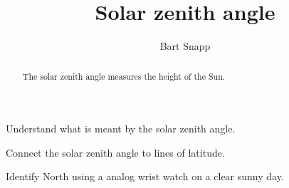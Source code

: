 \documentclass[noauthor,nooutcomes,handout,hints]{ximera}
\title{Solar zenith angle}
\author{Bart Snapp}
\begin{document}
\begin{abstract}
  The solar zenith angle measures the height of the Sun.
\end{abstract}
\maketitle

\begin{listOutcomes}
\item Understand what is meant by the solar zenith angle.
\item Connect the solar zenith angle to lines of latitude.
\item Identify North using a analog wrist watch on a clear sunny day.
\end{listOutcomes}


\mynewpage
\end{document}
